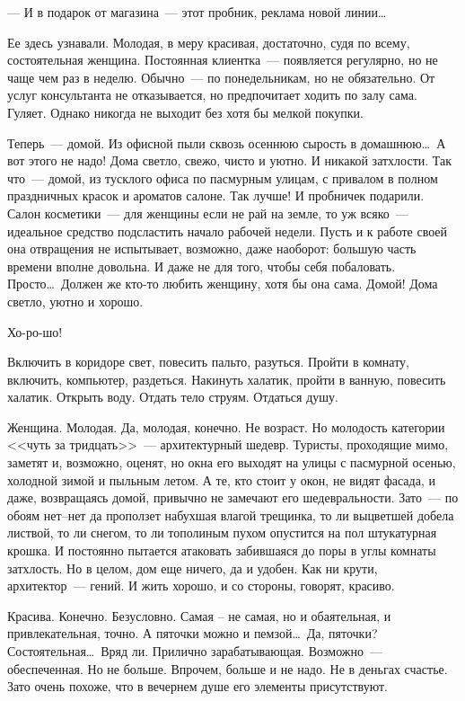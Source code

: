 

\noindent --- И в подарок от магазина~--- этот пробник, реклама новой 
линии\ldots

Ее здесь узнавали. Молодая, в меру красивая, достаточно, судя по всему,
состоятельная женщина. Постоянная клиентка~--- появляется регулярно, но не чаще
чем раз в неделю. Обычно~--- по понедельникам, но не обязательно. От услуг
консультанта не отказывается, но предпочитает ходить по залу сама. Гуляет.
Однако никогда не выходит без хотя бы мелкой покупки.

Теперь~--- домой. Из офисной пыли сквозь осеннюю сырость в домашнюю\ldots\ А вот 
этого
не надо! Дома светло, свежо, чисто и уютно. И никакой затхлости. Так что~---
домой, из тусклого офиса по пасмурным улицам, с привалом в полном праздничных
красок и ароматов салоне. Так лучше! И пробничек подарили.
Салон косметики~--- для женщины если не рай на земле, то уж всяко~--- идеальное
средство подсластить начало рабочей недели. Пусть и к работе своей она
отвращения не испытывает, возможно, даже наоборот: большую часть времени вполне довольна. 
И даже не для того, чтобы себя побаловать. Просто\ldots\ Должен
же кто-то любить женщину, хотя бы она сама. Домой! Дома светло, уютно и хорошо.

Хо-ро-шо!

Включить в коридоре свет, повесить пальто, разуться. Пройти в комнату, включить,
компьютер, раздеться. Накинуть халатик, пройти в ванную, повесить халатик.
Открыть воду. Отдать тело струям. Отдаться душу.

Женщина. Молодая. Да, молодая, конечно. Не возраст. Но молодость категории <<чуть
за тридцать>>~--- архитектурный шедевр. Туристы, проходящие мимо, заметят и,
возможно, оценят, но окна его выходят на улицы с пасмурной осенью, холодной
зимой и пыльным летом. А те, кто стоит у окон, не видят фасада, и даже,
возвращаясь домой, привычно не замечают его шедевральности. Зато~--- по обоям
нет--нет да проползет набухшая влагой трещинка, то ли выцветшей добела листвой,
то ли снегом, то ли тополиным пухом опустится на пол штукатурная крошка. И
постоянно пытается атаковать забившаяся до поры в углы комнаты затхлость. Но в
целом, дом еще ничего, да и удобен. Как ни крути, архитектор~---
гений. И жить хорошо, и со стороны, говорят, красиво.

Красива. Конечно. Безусловно. Самая -- не самая, но и обаятельная, и
привлекательная, точно. А пяточки можно и пемзой\ldots\ Да, пяточки?
Состоятельная\ldots\ Вряд ли. Прилично зарабатывающая. Возможно~--- 
обеспеченная. Но
не больше. Впрочем, больше и не надо. Не в деньгах счастье. Зато очень похоже,
что в вечернем душе его элементы присутствуют.

